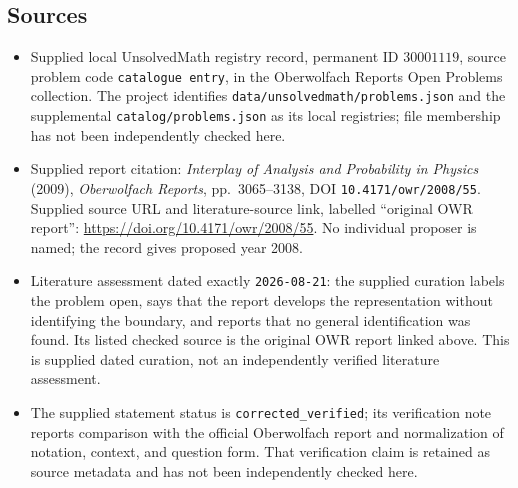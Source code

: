 \documentclass[11pt]{article}
\begin{document}
\subsection{Sources}
\begin{itemize}
\item Supplied local UnsolvedMath registry record, permanent ID \(30001119\), source problem code \texttt{catalogue entry}, in the Oberwolfach Reports Open Problems collection. The project identifies \texttt{data/unsolvedmath/problems.json} and the supplemental \texttt{catalog/problems.json} as its local registries; file membership has not been independently checked here.
\item Supplied report citation: \emph{Interplay of Analysis and Probability in Physics} (2009), \emph{Oberwolfach Reports}, pp.\ 3065--3138, DOI \texttt{10.4171/owr/2008/55}. Supplied source URL and literature-source link, labelled ``original OWR report'': \url{https://doi.org/10.4171/owr/2008/55}. No individual proposer is named; the record gives proposed year 2008.
\item Literature assessment dated exactly \texttt{2026-08-21}: the supplied curation labels the problem open, says that the report develops the representation without identifying the boundary, and reports that no general identification was found. Its listed checked source is the original OWR report linked above. This is supplied dated curation, not an independently verified literature assessment.
\item The supplied statement status is \texttt{corrected\_verified}; its verification note reports comparison with the official Oberwolfach report and normalization of notation, context, and question form. That verification claim is retained as source metadata and has not been independently checked here.
\end{itemize}
\end{document}
